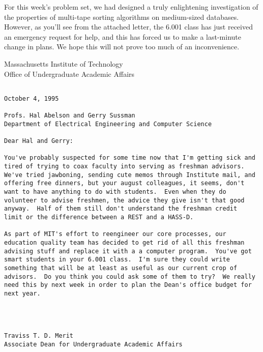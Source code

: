 




\medskip

For this week's problem set, we had designed a truly enlightening
investigation of the properties of multi-tape sorting algorithms on
medium-sized databases.  However, as you'll see from the attached
letter, the 6.001 class has just received an emergency request for
help, and this has forced us to make a last-minute change in plans.
We hope this will not prove too much of an inconvenience.

\pagebreak

\hspace*{1in}

\begin{center}
{\sc Massachusetts Institute of Technology \\
Office of Undergraduate Academic Affairs}
\end{center}

\bigskip

\begin{verbatim}

October 4, 1995

Profs. Hal Abelson and Gerry Sussman
Department of Electrical Engineering and Computer Science

Dear Hal and Gerry:

You've probably suspected for some time now that I'm getting sick and
tired of trying to coax faculty into serving as freshman advisors.
We've tried jawboning, sending cute memos through Institute mail, and
offering free dinners, but your august colleagues, it seems, don't
want to have anything to do with students.  Even when they do
volunteer to advise freshmen, the advice they give isn't that good
anyway.  Half of them still don't understand the freshman credit
limit or the difference between a REST and a HASS-D.

As part of MIT's effort to reengineer our core processes, our
education quality team has decided to get rid of all this freshman
advising stuff and replace it with a a computer program.  You've got
smart students in your 6.001 class.  I'm sure they could write
something that will be at least as useful as our current crop of
advisors.  Do you think you could ask some of them to try?  We really
need this by next week in order to plan the Dean's office budget for
next year.




Traviss T. D. Merit
Associate Dean for Undergraduate Academic Affairs

\end{verbatim}

